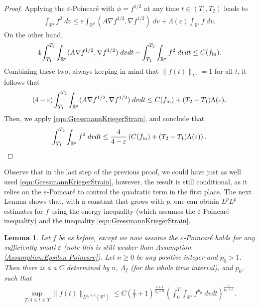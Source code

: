 \documentclass[12pt,american]{amsart}
\numberwithin{equation}{section}
\theoremstyle{plain}
\newtheorem{lem}[thm]{Lemma}
\theoremstyle{definition}                  %
\def\fin{f_{\textnormal{in}}}
\def\Lamp{\Lambda(\varepsilon)}
\begin{document}
\begin{proof}
  Applying the $\varepsilon$-Poincar\'e with $\phi=f^{1/2}$ at any time $t\in (T_1,T_2)$ leads to
  \begin{align*}
    \int_{\mathbb{R}^d} f^2\;dv \leq \varepsilon \int_{\mathbb{R}^d}(A\nabla f^{1/2},\nabla f^{1/2})\;dv+\Lamp\int_{\mathbb{R}^d}f\;dv. 
  \end{align*}
  On the other hand,
  \begin{align*}
    4\int_{T_1}^{T_2}\int_{\mathbb{R}^d}(A\nabla f^{1/2},\nabla f^{1/2})\;dvdt-\int_{T_1}^{T_2}\int_{\mathbb{R}^d}f^2\;dvdt \leq C(\fin). 
  \end{align*}
  Combining these two, always keeping in mind that $\|f(t)\|_{L^1}=1$ for all $t$, it follows that 
  \begin{align*}
    (4-\varepsilon)\int_{T_1}^{T_2}\int_{\mathbb{R}^d}(A\nabla f^{1/2},\nabla f^{1/2})\;dvdt \leq C(\fin)+(T_2-T_1)\Lamp.
  \end{align*}
  Then, we apply \eqref{eqn:GressmannKriegerStrain}, and conclude that 
  \begin{align*}
    \int_{T_1}^{T_2}\int_{\mathbb{R}^d}f^2\;dvdt \leq \frac{4}{4-\varepsilon}\left ( C(\fin)+(T_2-T_1)\Lamp\right ).
  \end{align*}
\end{proof}

Observe that in the last step of the previous proof, we could have just as well used \eqref{eqn:GressmannKriegerStrain}, however, the result is still conditional, as it relies on the $\varepsilon$-Poincar\'e to control the quadratic term in the first place. The next Lemma shows that, with a constant that grows with $p$, one can obtain $L^pL^p$ estimates for $f$ using the energy inequality (which assumes the $\varepsilon$-Poincar\'e inequality) and the inequality \eqref{eqn:GressmannKriegerStrain}.

\begin{lem}\label{lem:LpLp iterative bound for Coulomb}
  Let $f$ be as before, except we now assume the $\varepsilon$-Poincar\'e holds for any sufficiently small $\varepsilon$ (note this is still weaker than Assumption \ref{Assumption:Epsilon Poincare}). Let $n\geq 0$ be any positive integer and $p_0>1$. Then there is a a $C$ determined by $n$, $\Lambda_{f}$ (for the whole time interval), and $p_0$, such that 	
  \begin{align*}
     \sup \limits_{T/4\leq t\leq T}  \|f(t)\|_{L^{p_0+n}(\mathbb{R}^d)} \leq C\left (\frac{1}{T}+1 \right )^{\frac{n+1}{p_0+n}}\left (\int_{0}^T\int_{\mathbb{R}^d} f^{p_0}\;dvdt \right )^{\frac{1}{p_0+n}}.	  
   \end{align*}	  
\end{lem}
\end{document}
